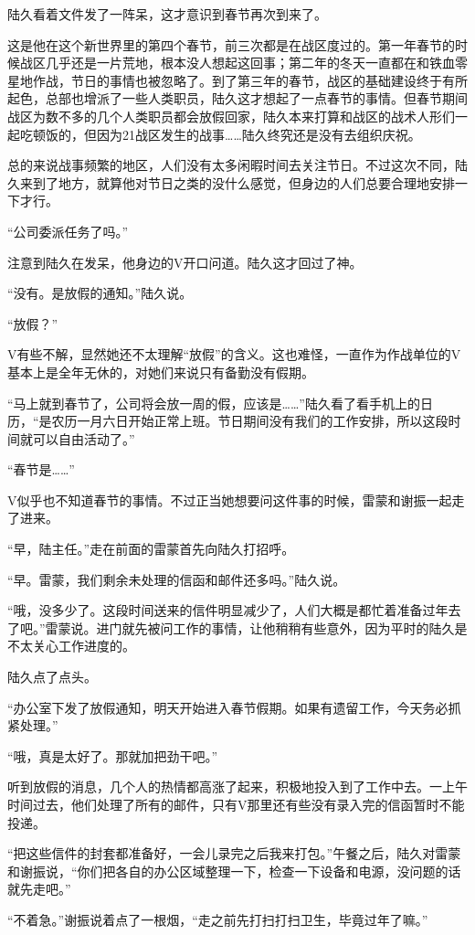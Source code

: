 陆久看着文件发了一阵呆，这才意识到春节再次到来了。

这是他在这个新世界里的第四个春节，前三次都是在战区度过的。第一年春节的时候战区几乎还是一片荒地，根本没人想起这回事；第二年的冬天一直都在和铁血零星地作战，节日的事情也被忽略了。到了第三年的春节，战区的基础建设终于有所起色，总部也增派了一些人类职员，陆久这才想起了一点春节的事情。但春节期间战区为数不多的几个人类职员都会放假回家，陆久本来打算和战区的战术人形们一起吃顿饭的，但因为21战区发生的战事……陆久终究还是没有去组织庆祝。

总的来说战事频繁的地区，人们没有太多闲暇时间去关注节日。不过这次不同，陆久来到了地方，就算他对节日之类的没什么感觉，但身边的人们总要合理地安排一下才行。

“公司委派任务了吗。”

注意到陆久在发呆，他身边的V开口问道。陆久这才回过了神。

“没有。是放假的通知。”陆久说。

“放假？”

V有些不解，显然她还不太理解“放假”的含义。这也难怪，一直作为作战单位的V基本上是全年无休的，对她们来说只有备勤没有假期。

“马上就到春节了，公司将会放一周的假，应该是……”陆久看了看手机上的日历，“是农历一月六日开始正常上班。节日期间没有我们的工作安排，所以这段时间就可以自由活动了。”

“春节是……”

V似乎也不知道春节的事情。不过正当她想要问这件事的时候，雷蒙和谢振一起走了进来。

“早，陆主任。”走在前面的雷蒙首先向陆久打招呼。

“早。雷蒙，我们剩余未处理的信函和邮件还多吗。”陆久说。

“哦，没多少了。这段时间送来的信件明显减少了，人们大概是都忙着准备过年去了吧。”雷蒙说。进门就先被问工作的事情，让他稍稍有些意外，因为平时的陆久是不太关心工作进度的。

陆久点了点头。

“办公室下发了放假通知，明天开始进入春节假期。如果有遗留工作，今天务必抓紧处理。”

“哦，真是太好了。那就加把劲干吧。”

听到放假的消息，几个人的热情都高涨了起来，积极地投入到了工作中去。一上午时间过去，他们处理了所有的邮件，只有V那里还有些没有录入完的信函暂时不能投递。

“把这些信件的封套都准备好，一会儿录完之后我来打包。”午餐之后，陆久对雷蒙和谢振说，“你们把各自的办公区域整理一下，检查一下设备和电源，没问题的话就先走吧。”

“不着急。”谢振说着点了一根烟，“走之前先打扫打扫卫生，毕竟过年了嘛。”

